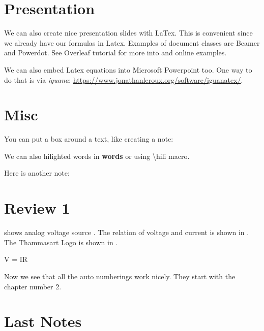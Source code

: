 \section{Presentation}
We can also create nice presentation slides with LaTex. This is convenient since we already have our formulas in Latex. Examples of document classes are Beamer and Powerdot.  See Overleaf tutorial for more into and online examples. 


We can also embed Latex equations into Microsoft Powerpoint too. One way to do that is via \textit{iguana}: \url{https://www.jonathanleroux.org/software/iguanatex/}.



\section{Misc}

You can put a box around a text, like creating a note:

We can also hilighted words in \textbf{\color{red} words} or  using \textbackslash hili macro. 

Here is another note:




\section{Review 1}

 shows analog voltage source \citep{Riaz2022}. The relation of voltage and current is shown in . The Thammasart Logo is shown in .


\beq
V = IR \label{eq:eq10} 
\eeq


Now we see that all the auto numberings work nicely. They start with the chapter number 2. 

\section{Last Notes}

